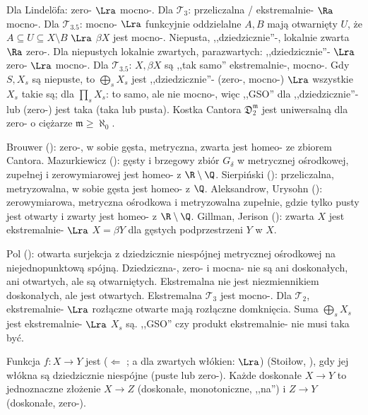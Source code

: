 Dla Lindelöfa: zero- $\Lra$ mocno-.
{\color{red}Dla $\mathcal T_3$: przeliczalna / ekstremalnie- $\Ra$ mocno-.}
Dla $\mathcal T_{3.5}$: mocno- $\Lra$ funkcyjnie oddzielalne $A, B$ mają otwarnięty $U$, że $A \subseteq U \subseteq X \setminus B$ $\Lra$ $\beta X$ jest mocno-.
Niepusta, ,,dziedzicznie''-, lokalnie zwarta $\Ra$ zero-. %
Dla niepustych lokalnie zwartych, parazwartych: ,,dziedzicznie''- $\Lra$ zero- $\Lra$ mocno-.
Dla $\mathcal T_{3.5}$: $X, \beta X$ są ,,tak samo'' ekstremalnie-, mocno-.
Gdy $S, X_s$ są niepuste, to $\bigoplus_s X_s$ jest ,,dziedzicznie''- (zero-, mocno-) $\Lra$ wszystkie $X_s$ takie są; dla $\prod_s X_s$: to samo, ale nie mocno-, więc ,,GSO'' dla ,,dziedzicznie''- lub (zero-) jest taka (taka lub pusta).
Kostka Cantora $\mathfrak D_2^{\mathfrak m}$ jest uniwersalną dla zero- o ciężarze $\mathfrak m \ge \aleph_0$. %


Brouwer (): zero-, w sobie gęsta, metryczna, zwarta jest homeo- ze zbiorem Cantora.
Mazurkiewicz (): gęsty i brzegowy zbiór $G_\delta$ w metrycznej ośrodkowej, zupełnej i zerowymiarowej jest homeo- z $\R \setminus \Q$.
Sierpiński (): przeliczalna, metryzowalna, w sobie gęsta jest homeo- z $\Q$.
Aleksandrow, Urysohn (): zerowymiarowa, metryczna ośrodkowa i metryzowalna zupełnie, gdzie tylko pusty jest otwarty i zwarty jest homeo- z $\R \setminus \Q$.
Gillman, Jerison (): zwarta $X$ jest ekstremalnie- $\Lra$ $X = \beta Y$ dla gęstych podprzestrzeni $Y$ w $X$.

Pol (): otwarta surjekcja z dziedzicznie niespójnej metrycznej ośrodkowej na niejednopunktową spójną.
Dziedziczna-, zero- i mocna- nie są ani doskonałych, ani otwartych, ale są otwarniętych.
Ekstremalna nie jest niezmiennikiem doskonałych, ale jest otwartych.
Ekstremalna $\mathcal T_3$ jest mocno-.
Dla $\mathcal T_2$, ekstremalnie- $\Lra$ rozłączne otwarte mają rozłączne domknięcia.
Suma $\bigoplus_s X_s$ jest ekstremalnie- $\Lra$ $X_s$ są.
,,GSO'' czy produkt ekstremalnie- nie musi taka być.

Funkcja $f \colon X \to Y$ jest  ($\Leftarrow$ ; a dla zwartych włókien: $\Lra$) (Stoiłow, ), gdy jej włókna są dziedzicznie niespójne (puste lub zero-).
Każde doskonałe $X \to Y$ to jednoznaczne złożenie $X \to Z$ (doskonałe, monotoniczne, ,,na'') i $Z \to Y$ (doskonałe, zero-).

